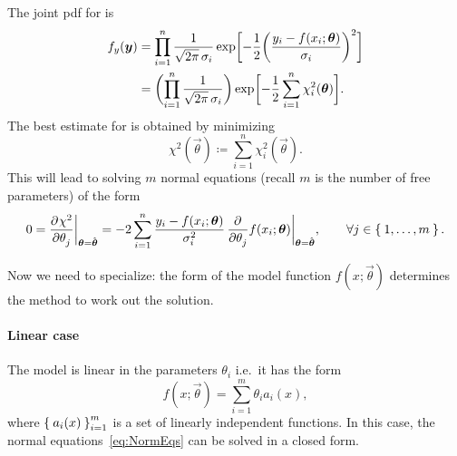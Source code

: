 The joint \ac{pdf} for  is
\begin{equation}
	\begin{aligned}
		f_{y}(\vec{y}) &= \prod_{i=1}^n \frac{1}{\sqrt{2\pi}\,\sigma_i}
		\exp\qp[\bigg]{%
			-\frac{1}{2} \tp[\bigg]{%
				\frac{y_i - f(x_i;\vec{\theta})}{\sigma_i}
			}^2
		}\\
		&=
		\tp[\bigg]{%
			\prod_{i=1}^n
			\frac{1}{\sqrt{2\pi}\,\sigma_i}
		}
		\exp\qp[\bigg]{%
			-\frac{1}{2} \sum_{i=1}^n\chi^2_i(\vec{\theta})
		}.
	\end{aligned}
\end{equation}
The best estimate for \vec{\theta} is obtained by minimizing
\begin{equation}
	\chi^2(\vec{\theta}) \coloneqq\sum_{i=1}^n\chi^2_i(\vec{\theta}).
\end{equation}
This will lead to solving $m$ normal equations (recall $m$ is the number of free parameters) of the form
\begin{equation}\label{eq:NormEqs}
	0 = \dfrac{{\mathop{}\!\mathrm{\partial}^{}}\chi^2}{\mathop{}\!\mathrm{\partial} \theta_j^{}}\bigg\rvert_{\bm{{\theta}}=\hat{\bm{{\theta}}}}
	=
	-2
	\sum_{i=1}^n \frac{y_i - f(x_i;\bm{{\theta}})}{\sigma_i^2}\,\dfrac{{\mathop{}\!\mathrm{\partial}^{}}}{\mathop{}\!\mathrm{\partial} \theta_j^{}}f(x_i;\bm{{\theta}})\bigg\rvert_{\bm{{\theta}} =\hat{\bm{{\theta}}}},
	\qquad
	\forall j\in\Set{1,\dots,m}.
\end{equation}


Now we need to specialize: the form of the model function $f(x;\vec{\theta})$ determines the method to work out the solution.

\paragraph{Linear case}
The model is linear in the parameters $\theta_i$ i.e.~it has the form
\begin{equation}
	f(x;\vec{\theta}) = \sum_{i=1}^m \theta_ia_i(x),
\end{equation}
where $\Set{a_i(x)}_{i=1}^m$ is a set of linearly independent functions.
In this case, the normal equations~\eqref{eq:NormEqs} can be solved in a closed form.



